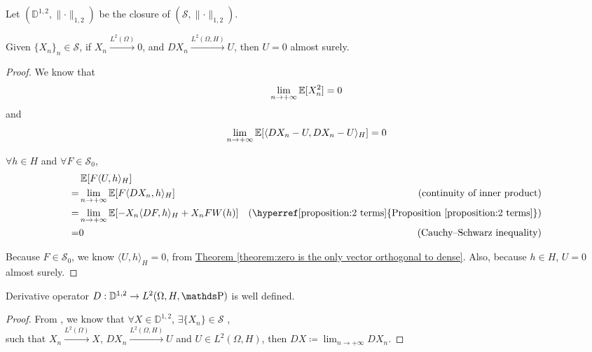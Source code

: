 \begin{notation}
Let $(\mathbb{D}^{1, 2}, \lVert \cdot \rVert_{1, 2})$ 
be the closure of $(\mathcal{S}, \lVert \cdot \rVert_{1, 2})$. 
\end{notation}

\begin{lemma}
\label{lemma:D is well defined}
Given $\{X_n\}_n \in \mathcal{S}$, 
if $X_n \xrightarrow{L^2(\Omega)} 0$, 
and $DX_n \xrightarrow{L^2(\Omega, H)} U$, 
then $U = 0$ almost surely.
\end{lemma}

\begin{proof}
We know that 
\[\lim_{n \to +\infty} \operatorname{\mathbb{E}}[X_n^2] = 0\]
and 
\[\lim_{n \to +\infty} 
\operatorname{\mathbb{E}}[ \langle DX_n - U , DX_n - U \rangle_{H} ] = 0\]

$\forall h \in H$ and $\forall F \in \mathcal{S}_{0}$,  
\begin{equation*}
\begin{aligned}
&\E[F \langle U, h \rangle_{H}]  \\
= &\lim_{n \to +\infty} \E[F \langle DX_n, h \rangle_{H}]
&\text{(continuity of inner product)} \\
= &\lim_{n \to +\infty} 
\E[- X_n \langle DF, h \rangle_{H}
+ X_n F W(h)]
&\text{(\hyperref[proposition:2 terms]
{Proposition \ref*{proposition:2 terms}})} \\
= & 0
&\text{(Cauchy–Schwarz inequality)} \\
\end{aligned}
\end{equation*}

Because $F \in \mathcal{S}_{0}$, we know $\langle U, h \rangle_{H} = 0$, 
from \hyperref[theorem:zero is the only vector orthogonal to dense]
{Theorem \ref*{theorem:zero is the only vector orthogonal to dense}}. 
Also, because $h \in H$, $U = 0$ almost surely. 
\end{proof}

\begin{theorem}
Derivative operator $D: \mathbb{D}^{1, 2} \to L^2(\Omega, H, \Prob)$ is well defined.  
\end{theorem}

\begin{proof}
From ,
we know that $\forall X \in \mathbb{D}^{1, 2}$, $\exists \{X_n\} \in \mathcal{S}$
, \\
such that $X_n \xrightarrow{L^2(\Omega)} X$,
$DX_n \xrightarrow{L^2(\Omega, H)} U$
and $U \in L^2(\Omega, H)$, then $DX \coloneqq \lim_{n \to +\infty} DX_n$. 
\end{proof}

